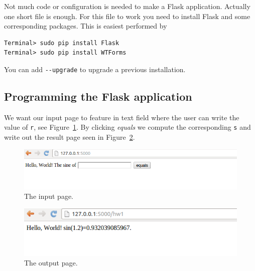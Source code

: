 \documentclass[%
oneside,                 %
final,                   %
10pt]{article}
\begin{document}

Not much code or configuration is needed to make a Flask application.
Actually one short file is enough. For this file to work you need to
install Flask and some corresponding packages. This is easiest
performed by

\begin{Verbatim}[numbers=none,fontsize=\fontsize{9pt}{9pt},baselinestretch=0.85]
Terminal> sudo pip install Flask
Terminal> sudo pip install WTForms
\end{Verbatim}
You can add \Verb!--upgrade! to upgrade a previous installation.

\subsection{Programming the Flask application}

We want our input page to feature in text field where the user can
write the value of \Verb!r!, see Figure~\ref{wf:hw1:flask:fig:input}.
By clicking \emph{equals}
we compute the corresponding \Verb!s! and write out the result page
seen in Figure~\ref{wf:hw1:flask:fig:result}.


\begin{figure}[ht]
  \centerline{\includegraphics[width=0.9\linewidth]{fig-web4sa/hw1_flask_input.png}}
  \caption{
  The input page. \label{wf:hw1:flask:fig:input}
  }
\end{figure}



\begin{figure}[ht]
  \centerline{\includegraphics[width=0.9\linewidth]{fig-web4sa/hw1_flask_output.png}}
  \caption{
  The output page. \label{wf:hw1:flask:fig:result}
  }
\end{figure}
\end{document}
